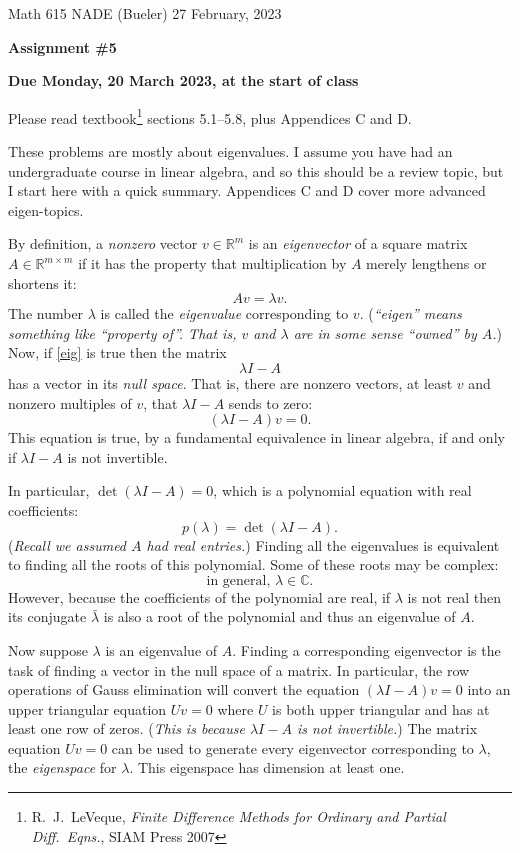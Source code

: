 \documentclass[12pt]{amsart}
\newcommand{\CC}{\mathbb{C}}
\newcommand{\RR}{\mathbb{R}}
\begin{document}
\scriptsize \noindent Math 615 NADE (Bueler) \hfill 27 February, 2023
\normalsize

\medskip\bigskip

\Large\centerline{\textbf{Assignment \#5}}
\large
\bigskip

\centerline{\textbf{Due Monday, 20 March 2023, at the start of class}}
\bigskip
\normalsize

\thispagestyle{empty}

\bigskip
Please read textbook\footnote{R.~J.~LeVeque, \emph{Finite Difference Methods for Ordinary and Partial Diff.~Eqns.}, SIAM Press 2007} sections 5.1--5.8, plus Appendices C and D.

These problems are mostly about eigenvalues.  I assume you have had an undergraduate course in linear algebra, and so this should be a review topic, but I start here with a quick summary.  Appendices C and D cover more advanced eigen-topics.

By definition, a \emph{nonzero} vector $v\in \RR^m$ is an \emph{eigenvector} of a square matrix $A \in \RR^{m\times m}$ if it has the property that multiplication by $A$ merely lengthens or shortens it:
\begin{equation}
    A v = \lambda v.  \label{eig}
\end{equation}
The number $\lambda$ is called the \emph{eigenvalue} corresponding to $v$.  (\emph{``eigen'' means something like ``property of''.  That is, $v$ and $\lambda$ are in some sense ``owned'' by $A$.})  Now, if \eqref{eig} is true then the matrix
    $$\lambda I - A$$
has a vector in its \emph{null space}.  That is, there are nonzero vectors, at least $v$ and nonzero multiples of $v$, that $\lambda I - A$ sends to zero:
    $$(\lambda I - A) v = 0.$$
This equation is true, by a fundamental equivalence in linear algebra, if and only if $\lambda I - A$ is not invertible.

In particular, $\det(\lambda I - A) = 0$, which is a polynomial equation with real coefficients:
    $$p(\lambda) = \det(\lambda I - A).$$
(\emph{Recall we assumed $A$ had real entries.})  Finding all the eigenvalues is equivalent to finding all the roots of this polynomial.  Some of these roots may be complex:
    $$\text{in general, } \lambda\in \CC.$$
However, because the coefficients of the polynomial are real, if $\lambda$ is not real then its conjugate $\bar \lambda$ is also a root of the polynomial and thus an eigenvalue of $A$.

Now suppose $\lambda$ is an eigenvalue of $A$.  Finding a corresponding eigenvector is the task of finding a vector in the null space of a matrix.  In particular, the row operations of Gauss elimination will convert the equation $(\lambda I - A) v = 0$ into an upper triangular equation $U v = 0$ where $U$ is both upper triangular and has at least one row of zeros.  (\emph{This is because $\lambda I - A$ is not invertible.})  The matrix equation $U v = 0$ can be used to generate every eigenvector corresponding to $\lambda$, the \emph{eigenspace} for $\lambda$.  This eigenspace has dimension at least one.
\end{document}
